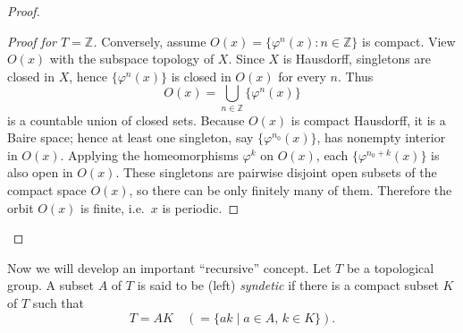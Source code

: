 \begin{proof}
\begin{mynote}
\begin{proof}[Proof for $T=\mathbb Z$]
            Conversely, assume $O(x)=\{\varphi^n(x):n\in\mathbb Z\}$ is compact. View $O(x)$ with the subspace topology of $X$.
            Since $X$ is Hausdorff, singletons are closed in $X$, hence $\{\varphi^n(x)\}$ is closed in $O(x)$ for every $n$.
            Thus
            \[
                O(x)=\bigcup_{n\in\mathbb Z}\{\varphi^n(x)\}
            \]
            is a countable union of closed sets. Because $O(x)$ is compact Hausdorff, it is a Baire space; hence at least one
            singleton, say $\{\varphi^{n_0}(x)\}$, has nonempty interior in $O(x)$.
            Applying the homeomorphisms $\varphi^k$ on $O(x)$, each $\{\varphi^{n_0+k}(x)\}$ is also open in $O(x)$.
            These singletons are pairwise disjoint open subsets of the compact space $O(x)$, so there can be only finitely many of them.
            Therefore the orbit $O(x)$ is finite, i.e.\ $x$ is periodic.
        \end{proof}
    \end{mynote}
\end{proof}


Now we will develop an important “recursive” concept. Let $T$ be a topological group. A subset $A$ of $T$ is said to be (left) \emph{syndetic} if there is a compact subset $K$ of $T$ such that
\[
    T = AK \quad ( = \{ak \mid a \in A,\, k \in K\} ).
\]


